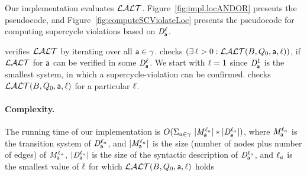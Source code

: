 Our implementation evaluates $\mathcal{LALT}$.
Figure~\ref{fig:impl.locANDOR}  presents the pseudocode, and 
Figure~\ref{fig:computeSCViolateLoc} presents the pseudocode for
computing supercycle violations based on $\mathit{D}_{\mathsf{a}}^{\ell}$.

 verifies $\mathcal{LALT}$ by iterating over all $\mathsf{a} \in \gamma$. 
 checks $(\exists\, \ell > 0: \mathcal{LALT}(B, Q_0, \mathsf{a}, \ell))$, \ie if $\mathcal{LALT}$ for $\mathsf{a}$ can be verified
in some  $\mathit{D}_{\mathsf{a}}^{\ell}$. We start with $\ell=1$ since $\mathit{D}_{\mathsf{a}}^{1}$ is the smallest system, in which a
supercycle-violation can be confirmed. 
 checks $\mathcal{LALT}(B, Q_0, \mathsf{a}, \ell)$ for a particular $\ell$. 

%
%





\paragraph{Complexity.} The running  time of our implementation is
$O(\Sigma_{a \in \gamma}\  |\mathit{M}_{\mathsf{a}}^{\ell_a}| * |\mathit{D}_{\mathsf{a}}^{\ell_a}|)$, 
where 
$\mathit{M}_{\mathsf{a}}^{\ell_a}$ is the transition system of
$\mathit{D}_{\mathsf{a}}^{\ell_a}$, and $|\mathit{M}_{\mathsf{a}}^{\ell_a}|$ is the size (number of nodes plus number of edges) of 
$\mathit{M}_{\mathsf{a}}^{\ell_a}$, 
$|\mathit{D}_{\mathsf{a}}^{\ell_a}|$ is the size of the syntactic description of $\mathit{D}_{\mathsf{a}}^{\ell_a}$, and 
$\ell_a$ is the smallest value of $\ell$ for which $\mathcal{LALT}(B, Q_0, \mathsf{a}, \ell)$ holds

